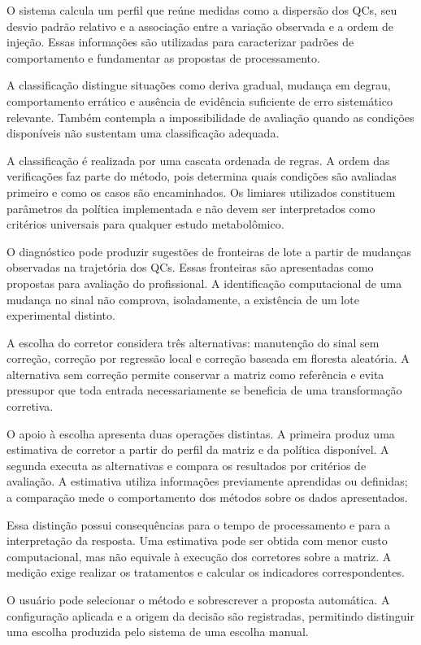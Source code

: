 O sistema calcula um perfil que reúne medidas como a dispersão dos QCs, seu desvio padrão relativo e a associação entre a variação observada e a ordem de injeção. Essas informações são utilizadas para caracterizar padrões de comportamento e fundamentar as propostas de processamento.

A classificação distingue situações como deriva gradual, mudança em degrau, comportamento errático e ausência de evidência suficiente de erro sistemático relevante. Também contempla a impossibilidade de avaliação quando as condições disponíveis não sustentam uma classificação adequada.

A classificação é realizada por uma cascata ordenada de regras. A ordem das verificações faz parte do método, pois determina quais condições são avaliadas primeiro e como os casos são encaminhados. Os limiares utilizados constituem parâmetros da política implementada e não devem ser interpretados como critérios universais para qualquer estudo metabolômico.

O diagnóstico pode produzir sugestões de fronteiras de lote a partir de mudanças observadas na trajetória dos QCs. Essas fronteiras são apresentadas como propostas para avaliação do profissional. A identificação computacional de uma mudança no sinal não comprova, isoladamente, a existência de um lote experimental distinto.

A escolha do corretor considera três alternativas: manutenção do sinal sem correção, correção por regressão local e correção baseada em floresta aleatória. A alternativa sem correção permite conservar a matriz como referência e evita pressupor que toda entrada necessariamente se beneficia de uma transformação corretiva.

O apoio à escolha apresenta duas operações distintas. A primeira produz uma estimativa de corretor a partir do perfil da matriz e da política disponível. A segunda executa as alternativas e compara os resultados por critérios de avaliação. A estimativa utiliza informações previamente aprendidas ou definidas; a comparação mede o comportamento dos métodos sobre os dados apresentados.

Essa distinção possui consequências para o tempo de processamento e para a interpretação da resposta. Uma estimativa pode ser obtida com menor custo computacional, mas não equivale à execução dos corretores sobre a matriz. A medição exige realizar os tratamentos e calcular os indicadores correspondentes.

O usuário pode selecionar o método e sobrescrever a proposta automática. A configuração aplicada e a origem da decisão são registradas, permitindo distinguir uma escolha produzida pelo sistema de uma escolha manual.

